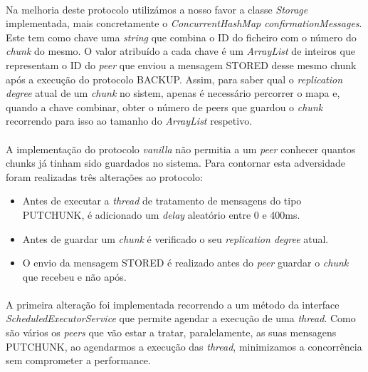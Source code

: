 \documentclass[11pt,oneside]{book}
\begin{document}
\paragraph{}
    Na melhoria deste protocolo utilizámos a nosso favor a classe \textit{Storage}
    implementada, mais concretamente o \textit{ConcurrentHashMap confirmationMessages}.
    Este tem como chave uma \textit{string} que combina o ID do ficheiro com o número
    do \textit{chunk} do mesmo. O valor atribuído a cada chave é um 
    \textit{ArrayList} de inteiros que representam o ID do \textit{peer} que 
    enviou a mensagem STORED desse mesmo chunk após a execução do protocolo BACKUP. 
    Assim, para saber qual o \textit{replication degree} atual de um \textit{chunk} 
    no sistem, apenas é necessário percorrer o mapa e, quando a chave combinar, 
    obter o número de peers que guardou o \textit{chunk} recorrendo para isso ao 
    tamanho do \textit{ArrayList} respetivo.
\paragraph{}
    A implementação do protocolo \textit{vanilla} não permitia a um \textit{peer}
    conhecer quantos chunks já tinham sido guardados no sistema. Para contornar 
    esta adversidade foram realizadas três alterações ao protocolo:
    \begin{itemize}
        \item Antes de executar a \textit{thread} de tratamento de mensagens do tipo
        PUTCHUNK, é adicionado um \textit{delay} aleatório entre 0 e 400ms.
        \item Antes de guardar um \textit{chunk} é verificado o seu
        \textit{replication degree} atual.
        \item O envio da mensagem STORED é realizado antes do \textit{peer}
        guardar o \textit{chunk} que recebeu e não após.
    \end{itemize}

\paragraph{}
    A primeira alteração foi implementada recorrendo a um método da interface
    \textit{ScheduledExecutorService} que permite agendar a execução de uma
    \textit{thread}. Como são vários os \textit{peers} que vão estar a
    tratar, paralelamente, as suas mensagens PUTCHUNK, ao agendarmos a execução
    das \textit{thread}, minimizamos a concorrência sem comprometer a performance.
\end{document}
